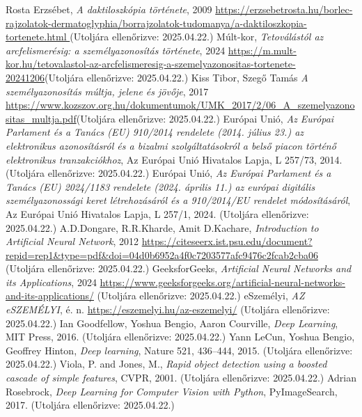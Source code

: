 \documentclass[
]{thesis-ekf}
\theoremstyle{definition}
\theoremstyle{remark}
\begin{document}
\begin{thebibliography}{2}
	 Rosta Erzsébet, \textit{A daktiloszkópia története}, 2009 \url{https://erzsebetrosta.hu/borlec-rajzolatok-dermatoglyphia/borrajzolatok-tudomanya/a-daktiloszkopia-tortenete.html }(Utoljára ellenőrizve: 2025.04.22.)
	 Múlt-kor, \textit{Tetoválástól az arcfelismerésig: a személyazonosítás története}, 2024 \url{https://m.mult-kor.hu/tetovalastol-az-arcfelismeresig-a-szemelyazonositas-tortenete-20241206}(Utoljára ellenőrizve: 2025.04.22.)
	 Kiss Tibor, Szegő Tamás \textit{A személyazonosítás múltja, jelene és jövője}, 2017 \url{https://www.kozszov.org.hu/dokumentumok/UMK_2017/2/06_A_szemelyazonositas_multja.pdf}(Utoljára ellenőrizve: 2025.04.22.)
	 Európai Unió, \textit{Az Európai Parlament és a Tanács (EU) 910/2014 rendelete (2014. július 23.) az elektronikus azonosításról és a bizalmi szolgáltatásokról a belső piacon történő elektronikus tranzakciókhoz}, Az Európai Unió Hivatalos Lapja, L 257/73, 2014. (Utoljára ellenőrizve: 2025.04.22.)
	 Európai Unió, \textit{Az Európai Parlament és a Tanács (EU) 2024/1183 rendelete (2024. április 11.) az európai digitális személyazonossági keret létrehozásáról és a 910/2014/EU rendelet módosításáról}, Az Európai Unió Hivatalos Lapja, L 257/1, 2024. (Utoljára ellenőrizve: 2025.04.22.)
	 A.D.Dongare, R.R.Kharde, Amit D.Kachare, \textit{Introduction to Artificial Neural Network}, 2012 \url{https://citeseerx.ist.psu.edu/document?repid=rep1&type=pdf&doi=04d0b6952a4f0c7203577afc9476c2fcab2cba06} (Utoljára ellenőrizve: 2025.04.22.)
	 GeeksforGeeks, \textit{Artificial Neural Networks and its Applications}, 2024 \url{https://www.geeksforgeeks.org/artificial-neural-networks-and-its-applications/} (Utoljára ellenőrizve: 2025.04.22.)
	 eSzemélyi, \textit{AZ eSZEMÉLYI}, é. n. \url{https://eszemelyi.hu/az-eszemelyi/} (Utoljára ellenőrizve: 2025.04.22.)
	 Ian Goodfellow, Yoshua Bengio, Aaron Courville, \textit{Deep Learning}, MIT Press, 2016. (Utoljára ellenőrizve: 2025.04.22.)
	 Yann LeCun, Yoshua Bengio, Geoffrey Hinton, \textit{Deep learning}, Nature 521, 436–444, 2015. (Utoljára ellenőrizve: 2025.04.22.)
	 Viola, P. and Jones, M., \textit{Rapid object detection using a boosted cascade of simple features}, CVPR, 2001. (Utoljára ellenőrizve: 2025.04.22.)
	 Adrian Rosebrock, \textit{Deep Learning for Computer Vision with Python}, PyImageSearch, 2017. (Utoljára ellenőrizve: 2025.04.22.)

\end{thebibliography}
\end{document}
